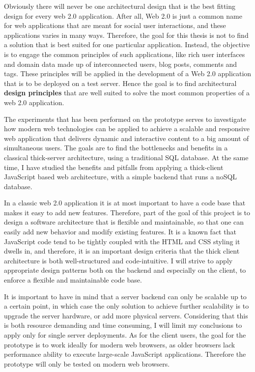 	Obviously there will never be one architectural design that is the best fitting design for every web 2.0 application. After all, Web 2.0 is just a common name for web applications that are meant for social user interactions, and these applications varies in many ways. Therefore, the goal for this thesis is not to find a solution that is best suited for one particular application. Instead, the objective is to engage the common principles of such applications, like rich user interfaces and domain data made up of interconnected users, blog posts, comments and tags. These principles will be applied in the development of a Web 2.0 application that is to be deployed on a test server. Hence the goal is to find architectural \textbf{design principles} that are well suited to solve the most common properties of a web 2.0 application.  
	
The experiments that has been performed on the prototype serves to investigate how modern web technologies can be applied to achieve a scalable and responsive web application that delivers dynamic and interactive content to a big amount of simultaneous users. The goals are to find the bottlenecks and benefits in a classical thick-server architecture, using a traditional SQL database. At the same time, I have studied the benefits and pitfalls from applying a thick-client JavaScript based web architecture, with a simple backend that runs a noSQL database.  

In a classic web 2.0 application it is at most important to have a code base that makes it easy to add new features. Therefore, part of the goal of this project is to design a software architecture that is flexible and maintainable, so that one can easily add new behavior and modify existing features. It is a known fact that JavaScript code tend to be tightly coupled with the HTML and CSS styling it dwells in, and therefore, it is an important design criteria that the thick client architecture is both well-structured and code-intuitive. I will strive to apply appropriate design patterns both on the backend and especially on the client, to enforce a flexible and maintainable code base.  
        
It is important to have in mind that a server backend can only be scalable up to a certain point, in which case the only solution to achieve further scalability is to upgrade the server hardware, or add more physical servers. Considering that this is both resource demanding and time consuming, I will limit my conclusions to apply only for single server deployments. As for the client users, the goal for the prototype is to work ideally for modern web browsers, as older browsers lack performance ability to execute large-scale JavaScript applications. Therefore the prototype will only be tested on modern web browsers.

